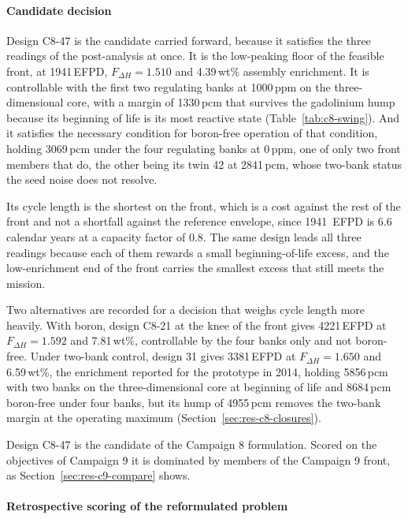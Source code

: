\paragraph{Candidate decision}
\label{sec:res-c8-decision}

Design C8-47 is the candidate carried forward, because it satisfies the
three readings of the post-analysis at once. It is the low-peaking
floor of the feasible front, at 1941\,EFPD, $F_{\Delta H} = 1.510$ and
4.39\,wt\% assembly enrichment. It is controllable with the first two
regulating banks at 1000\,ppm on the three-dimensional core, with a
margin of 1330\,pcm that survives the gadolinium hump because its
beginning of life is its most reactive state
(Table~\ref{tab:c8-swing}). And it satisfies the necessary condition
for boron-free operation of that condition,
holding 3069\,pcm under the four regulating banks at 0\,ppm, one of
only two front members that do, the other being its twin 42 at
2841\,pcm, whose two-bank status the seed noise does not resolve.

Its cycle length is the shortest on the front, which is a cost against
the rest of the front and not a shortfall against the reference
envelope, since \SI{1941}{EFPD} is 6.6 calendar years at a capacity
factor of 0.8. The same design leads all three readings because each of
them rewards a small beginning-of-life excess, and the low-enrichment
end of the front carries the smallest excess that still meets the
mission.

Two alternatives are recorded for a decision that weighs cycle length
more heavily. With boron, design C8-21 at the knee of the front gives
4221\,EFPD at $F_{\Delta H} = 1.592$ and 7.81\,wt\%, controllable by
the four banks only and not boron-free. Under two-bank control, design
31 gives 3381\,EFPD at $F_{\Delta H} = 1.650$ and 6.59\,wt\%, the
enrichment reported for the prototype in 2014, holding 5856\,pcm with
two banks on the three-dimensional core at beginning of life and
8684\,pcm boron-free under four banks, but its hump of 4955\,pcm
removes the two-bank margin at the operating maximum
(Section~\ref{sec:res-c8-closures}).

Design C8-47 is the candidate of the Campaign 8 formulation. Scored on the
objectives of Campaign 9 it is dominated by members of the Campaign 9
front, as Section~\ref{sec:res-c9-compare} shows.

\paragraph{Retrospective scoring of the reformulated problem}
\label{sec:res-c8-retro}

